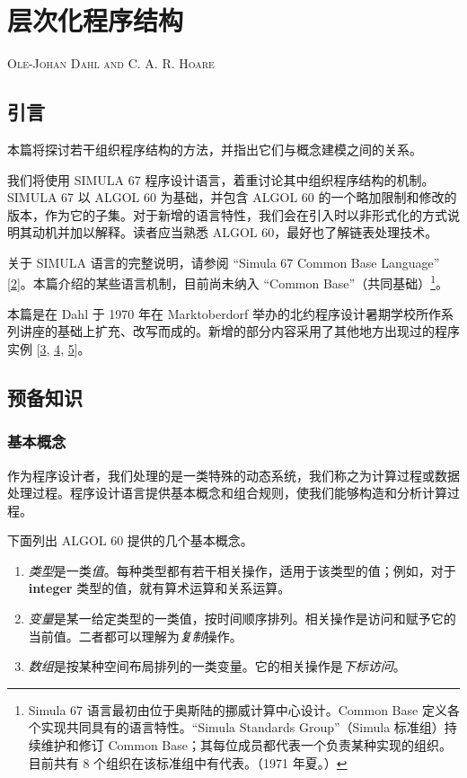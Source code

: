 \chapter{层次化程序结构}

{
	\noindent
	\scshape\hfill\scriptsize Ole-Johan Dahl and C. A. R. Hoare\hfill
}
\renewcommand{\leftmark}{\normalfont\scriptsize\hfill OLE-JOHAN DAHL AND C. A. R. HOARE\hfill}
\medskip

\section{引言}

本篇将探讨若干组织程序结构的方法，并指出它们与概念建模之间的关系。

我们将使用 SIMULA 67 程序设计语言，着重讨论其中组织程序结构的机制。SIMULA 67 以 ALGOL 60 为基础，并包含 ALGOL 60 的一个略加限制和修改的版本，作为它的子集。对于新增的语言特性，我们会在引入时以非形式化的方式说明其动机并加以解释。读者应当熟悉 ALGOL 60，最好也了解链表处理技术。

关于 SIMULA 语言的完整说明，请参阅 ``Simula 67 Common Base Language'' [\hyperref[ref:2]{2}]。本篇介绍的某些语言机制，目前尚未纳入 ``Common Base''（共同基础）\footnote{Simula 67 语言最初由位于奥斯陆的挪威计算中心设计。Common Base 定义各个实现共同具有的语言特性。``Simula Standards Group''（Simula 标准组）持续维护和修订 Common Base；其每位成员都代表一个负责某种实现的组织。目前共有 8 个组织在该标准组中有代表。（1971 年夏。）}。

本篇是在 Dahl 于 1970 年在 Marktoberdorf 举办的北约程序设计暑期学校所作系列讲座的基础上扩充、改写而成的。新增的部分内容采用了其他地方出现过的程序实例 [\hyperref[ref:3]{3}, \hyperref[ref:4]{4}, \hyperref[ref:5]{5}]。

\section{预备知识}

\subsection{基本概念}

作为程序设计者，我们处理的是一类特殊的动态系统，我们称之为计算过程或数据处理过程。程序设计语言提供基本概念和组合规则，使我们能够构造和分析计算过程。

下面列出 ALGOL 60 提供的几个基本概念。

\begin{enumerate}[wide, nosep, label=(\arabic*)]
	\item \textit{类型}是一类\textit{值}。每种类型都有若干相关操作，适用于该类型的值；例如，对于 \textbf{integer} 类型的值，就有算术运算和关系运算。
	\item \textit{变量}是某一给定类型的一类值，按时间顺序排列。相关操作是访问和赋予它的当前值。二者都可以理解为\textit{复制}操作。
	\item \textit{数组}是按某种空间布局排列的一类变量。它的相关操作是\textit{下标访问}。
\end{enumerate}

